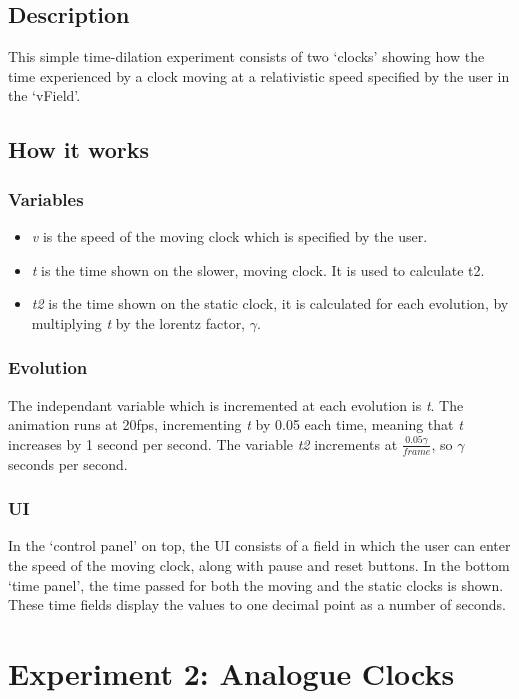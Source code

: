 \subsection*{Description}
\label{sec-1-1}

This simple time-dilation experiment consists of two `clocks' showing how the time experienced by a clock moving at a relativistic speed specified by the user in the `vField'.
\subsection*{How it works}
\label{sec-1-2}
\subsubsection*{Variables}
\label{sec-1-2-1}

\begin{itemize}
\item \emph{v} is the speed of the moving clock which is specified by the user.
\item \emph{t} is the time shown on the slower, moving clock. It is used to calculate t2.
\item \emph{t2} is the time shown on the static clock, it is calculated for each evolution, by multiplying \emph{t} by the lorentz factor, $\gamma$.
\end{itemize}
\subsubsection*{Evolution}
\label{sec-1-2-2}

The independant variable which is incremented at each evolution is \emph{t}. The animation runs at 20fps, incrementing \emph{t} by 0.05 each time, meaning that \emph{t} increases by 1 second per second.
The variable \emph{t2} increments at $\frac{0.05 \gamma}{frame}$, so $\gamma$ seconds per second.
\subsubsection*{UI}
\label{sec-1-2-3}

In the `control panel' on top, the UI consists of a field in which the user can enter the speed of the moving clock, along with pause and reset buttons.
In the bottom `time panel', the time passed for both the moving and the static clocks is shown. These time fields display the values to one decimal point as a number of seconds.
\section*{Experiment 2: Analogue Clocks}
\label{sec-2}
